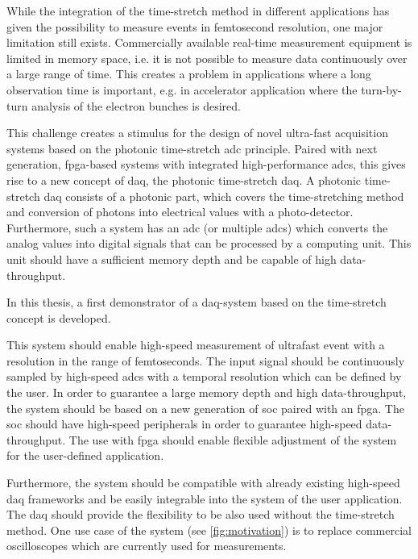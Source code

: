 While the integration of the time-stretch method in different applications has given the possibility to measure events in femtosecond resolution, one major limitation still exists. Commercially available real-time measurement equipment is limited in memory space, i.e. it is not possible to measure data continuously over a large range of time. This creates a problem in applications where a long observation time is important, e.g. in accelerator application where the turn-by-turn analysis of the electron bunches is desired.

This challenge creates a stimulus for the design of novel ultra-fast acquisition systems based on the photonic time-stretch \gls{adc} principle. Paired with next generation, \gls{fpga}-based systems with integrated high-performance \glspl{adc}, this gives rise to a new concept of \gls{daq}, the photonic time-stretch \gls{daq}.
A photonic time-stretch \gls{daq} consists of a photonic part, which covers the time-stretching method and conversion of photons into electrical values with a photo-detector. Furthermore, such a system has an \gls{adc} (or multiple \glspl{adc}) which converts the analog values into digital signals that can be processed by a computing unit. This unit should have a sufficient memory depth and be capable of high data-throughput.

In this thesis, a first demonstrator of a \gls{daq}-system based on the time-stretch concept is developed.

This system should enable high-speed measurement of ultrafast event with a resolution in the range of femtoseconds.
The input signal should be continuously sampled by high-speed \glspl{adc} with a temporal resolution which can be defined by the user.
In order to guarantee a large memory depth and high data-throughput, the system should be based on a new generation of \gls{soc} paired with an \gls{fpga}. 
The \gls{soc} should have high-speed peripherals in order to guarantee high-speed data-throughput. 
The use with \gls{fpga} should enable flexible adjustment of the system for the user-defined application. 

Furthermore, the system should be compatible with already existing high-speed \gls{daq} frameworks and be easily integrable into the system of the user application.
The \gls{daq} should provide the flexibility to be also used without the time-stretch method.
One use case of the system (see \autoref{fig:motivation}) is to replace commercial oscilloscopes which are currently used for measurements.

